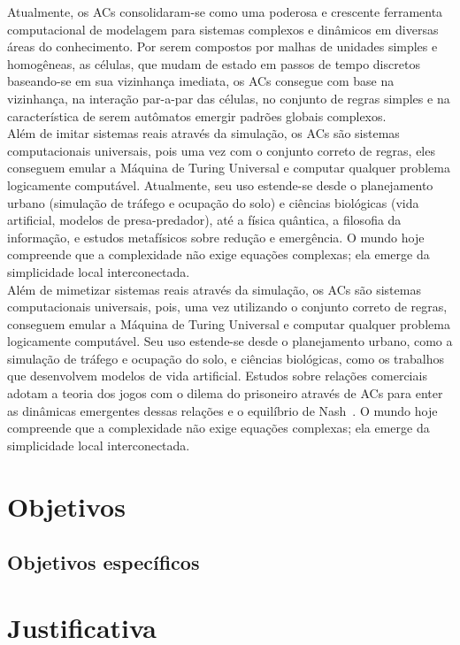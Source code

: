 Atualmente, os ACs consolidaram-se como uma poderosa e crescente ferramenta computacional de modelagem para sistemas complexos e dinâmicos em diversas áreas do conhecimento. Por serem compostos por malhas de unidades simples e homogêneas, as células, que mudam de estado em passos de tempo discretos baseando-se em sua vizinhança imediata, os ACs consegue com base na vizinhança, na interação par-a-par das células, no conjunto de regras simples e na característica de serem autômatos emergir padrões globais complexos.\\

Além de imitar sistemas reais através da simulação, os ACs são sistemas computacionais universais, pois uma vez com o conjunto correto de regras, eles conseguem emular a Máquina de Turing Universal e computar qualquer problema logicamente computável. Atualmente, seu uso estende-se desde o planejamento urbano (simulação de tráfego e ocupação do solo) e ciências biológicas (vida artificial, modelos de presa-predador), até a física quântica, a filosofia da informação, e estudos metafísicos sobre redução e emergência. O mundo hoje compreende que a complexidade não exige equações complexas; ela emerge da simplicidade local interconectada.\\


Além de mimetizar sistemas reais através da simulação, os ACs são sistemas computacionais universais, pois, uma vez utilizando o  conjunto correto de regras, conseguem emular a Máquina de Turing Universal e computar qualquer problema logicamente computável. Seu uso estende-se desde o planejamento urbano, como a simulação de tráfego e ocupação do solo, e ciências biológicas, como os trabalhos que desenvolvem modelos de vida artificial. Estudos sobre relações comerciais adotam a teoria dos jogos com o dilema do prisoneiro através de ACs para enter as dinâmicas emergentes dessas relações e o equilíbrio de Nash~\cite{nowak1992evolutionary}. O mundo hoje compreende que a complexidade não exige equações complexas; ela emerge da simplicidade local interconectada.

\section{Objetivos}

\subsection{Objetivos específicos}

\section{Justificativa}

